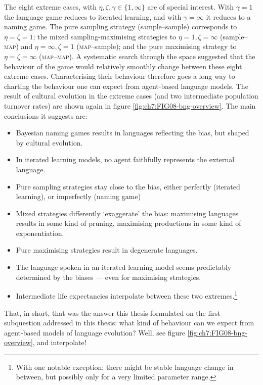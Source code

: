 \documentclass{../src/bcthesispart}
\begin{document}
The eight extreme cases, with $\eta, \zeta, \gamma \in \{1, \infty\}$ are of special interest. 
With $\gamma=1$ the language game reduces to iterated learning, and with $\gamma=\infty$ it reduces to a naming game.
The pure sampling strategy (sample--sample) corresponds to $\eta=\zeta=1$; the mixed sampling-maximising strategies to $\eta=1, \zeta= \infty$ (sample--\textsc{map}) and $\eta=\infty, \zeta=1$ (\textsc{map}--sample); and the pure maximising strategy to $\eta=\zeta=\infty$ (\textsc{map--map}).
A systematic search through the space suggested that the behaviour of the game would relatively smoothly change between these eight extreme cases.
Characterising their behaviour therefore goes a long way to charting the behaviour one can expect from agent-based language models.
The result of cultural evolution in the extreme cases (and two intermediate population turnover rates) are shown again in figure \ref{fig:ch7:FIG08-bng-overview}.
The main conclusions it suggests are:
\begin{itemize}
	\item Bayesian naming games results in languages reflecting the bias, but shaped by cultural evolution.
	\item In iterated learning models, no agent faithfully represents the external language.
	\item Pure sampling strategies stay close to the bias, either perfectly (iterated learning), or imperfectly (naming game)
	\item Mixed strategies differently ‘exaggerate’ the bias: maximising languages results in some kind of pruning, maximising productions in some kind of exponentiation.
	\item Pure maximising strategies result in degenerate languages.
	\item The language spoken in an iterated learning model seems predictably determined by the biases — even for maximising strategies.
	\item Intermediate life expectancies interpolate between these two extremes.\footnote{%
		With one notable exception: there might be stable language change in between, but possibly only for a very limited parameter range.
		}
\end{itemize}
That, in short, that was the answer this thesis formulated on the first subquestion addressed in this thesis: what kind of behaviour can we expect from agent-based models of language evolution? Well, see figure \ref{fig:ch7:FIG08-bng-overview}, and interpolate!
\end{document}
